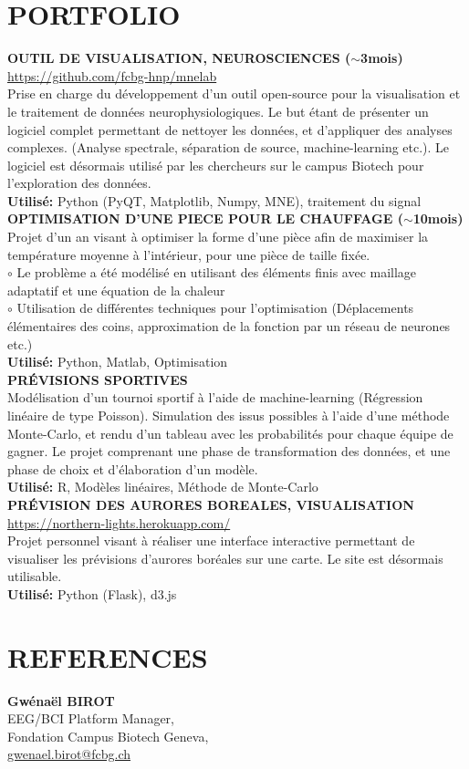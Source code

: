\documentclass[]{cv-style}          %
\begin{document}
\section{PORTFOLIO}
\textbf{OUTIL DE VISUALISATION, NEUROSCIENCES ($\sim$3mois)}\\
  \url{https://github.com/fcbg-hnp/mnelab}\\
  Prise en charge du développement d'un outil open-source pour la visualisation et le traitement de données neurophysiologiques. Le but étant de présenter un logiciel complet permettant de nettoyer les données, et d'appliquer des analyses complexes. (Analyse spectrale, séparation de source, machine-learning etc.). Le logiciel est désormais utilisé par les chercheurs sur le campus Biotech pour l'exploration des données.\\
  \textbf{Utilisé:} Python (PyQT, Matplotlib, Numpy, MNE), traitement du signal \\[0.4cm]
  \textbf{OPTIMISATION D'UNE PIECE POUR LE CHAUFFAGE ($\sim$10mois)}\\
  Projet d'un an visant à optimiser la forme d'une pièce afin de maximiser la température moyenne à l'intérieur, pour une pièce de taille fixée.\\
  $\circ$ Le problème a été modélisé en utilisant des éléments finis avec maillage adaptatif et une équation de la chaleur\\
  $\circ$ Utilisation de différentes techniques pour l'optimisation (Déplacements élémentaires des coins, approximation de la fonction par un réseau de neurones etc.) \\
  \textbf{Utilisé:} Python, Matlab, Optimisation \\[0.4cm]
  \textbf{PRÉVISIONS SPORTIVES}\\
  Modélisation d'un tournoi sportif à l'aide de machine-learning (Régression linéaire de type Poisson). Simulation des issus possibles à l'aide d'une méthode Monte-Carlo, et rendu d'un tableau avec les probabilités pour chaque équipe de gagner. Le projet comprenant une phase de transformation des données, et une phase de choix et d'élaboration d'un modèle.\\
  \textbf{Utilisé:} R, Modèles linéaires, Méthode de Monte-Carlo \\[0.4cm]
  \textbf{PRÉVISION DES AURORES BOREALES, VISUALISATION}\\
  \url{https://northern-lights.herokuapp.com/}\\
  Projet personnel visant à réaliser une interface interactive permettant de visualiser les prévisions d'aurores boréales sur une carte. Le site est désormais utilisable.\\
  \textbf{Utilisé:} Python (Flask), d3.js \\[0.4cm]
  \section{REFERENCES}
    \textbf{Gwénaël BIROT} \\
    EEG/BCI Platform Manager, \\
    Fondation Campus Biotech Geneva,\\
    \url{gwenael.birot@fcbg.ch}
\end{document}
